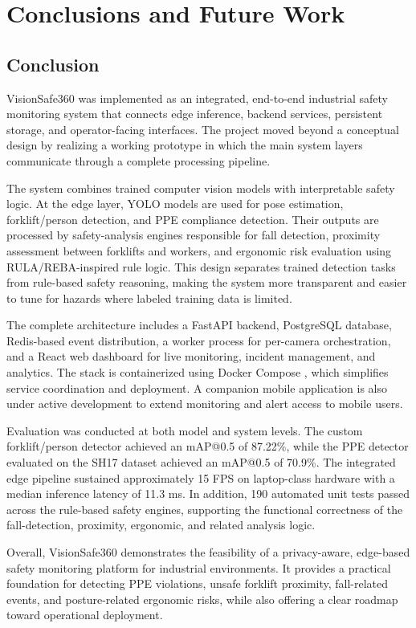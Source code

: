 \chapter{Conclusions and Future Work}

\section{Conclusion}

VisionSafe360 was implemented as an integrated, end-to-end industrial safety monitoring system that connects edge inference, backend services, persistent storage, and operator-facing interfaces. The project moved beyond a conceptual design by realizing a working prototype in which the main system layers communicate through a complete processing pipeline.

The system combines trained computer vision models with interpretable safety logic. At the edge layer, YOLO models are used for pose estimation, forklift/person detection, and PPE compliance detection. Their outputs are processed by safety-analysis engines responsible for fall detection, proximity assessment between forklifts and workers, and ergonomic risk evaluation using RULA/REBA-inspired rule logic. This design separates trained detection tasks from rule-based safety reasoning, making the system more transparent and easier to tune for hazards where labeled training data is limited.

The complete architecture includes a FastAPI backend, PostgreSQL database, Redis-based event distribution, a worker process for per-camera orchestration, and a React web dashboard for live monitoring, incident management, and analytics. The stack is containerized using Docker Compose \cite{docker_compose_docs}, which simplifies service coordination and deployment. A companion mobile application is also under active development to extend monitoring and alert access to mobile users.

Evaluation was conducted at both model and system levels. The custom forklift/person detector achieved an mAP@0.5 of 87.22\%, while the PPE detector evaluated on the SH17 dataset achieved an mAP@0.5 of 70.9\%. The integrated edge pipeline sustained approximately 15 FPS on laptop-class hardware with a median inference latency of 11.3 ms. In addition, 190 automated unit tests passed across the rule-based safety engines, supporting the functional correctness of the fall-detection, proximity, ergonomic, and related analysis logic.

Overall, VisionSafe360 demonstrates the feasibility of a privacy-aware, edge-based safety monitoring platform for industrial environments. It provides a practical foundation for detecting PPE violations, unsafe forklift proximity, fall-related events, and posture-related ergonomic risks, while also offering a clear roadmap toward operational deployment.

